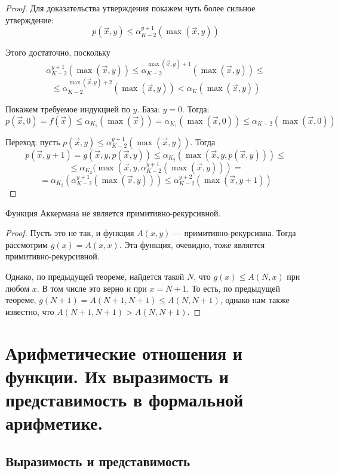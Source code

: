 \begin{proof}
Для доказательства утверждения покажем чуть более сильное утверждение:
$$p(\overrightarrow{x},y) \le \alpha_{K-2}^{y+1}(\max(\overrightarrow{x},y))$$

Этого достаточно, поскольку 
$$\alpha_{K-2}^{y+1}(\max(\overrightarrow{x},y)) \le
\alpha_{K-2}^{\max(\overrightarrow{x},y)+1}(\max(\overrightarrow{x},y)) \le$$
$$\le \alpha_{K-2}^{\max(\overrightarrow{x},y)+2}(\max(\overrightarrow{x},y)) <
\alpha_K(\max(\overrightarrow{x},y))$$

Покажем требуемое индукцией по $y$.
База: $y = 0$. Тогда: $$p(\overrightarrow{x},0) = f(\overrightarrow{x}) \le 
\alpha_{K_1}(\max(\overrightarrow{x})) = \alpha_{K_1}(\max(\overrightarrow{x},0)) \le 
\alpha_{K-2}(\max(\overrightarrow{x},0))$$

Переход: пусть $p(\overrightarrow{x},y) \le \alpha^{y+1}_{K-2}(\max(\overrightarrow{x},y))$.
Тогда $$p(\overrightarrow{x},y+1) = g(\overrightarrow{x},y,p(\overrightarrow{x},y))
\le \alpha_{K_2}(\max(\overrightarrow{x},y,p(\overrightarrow{x},y))) \le$$
$$\le \alpha_{K_2}(\max(\overrightarrow{x},y,\alpha^{y+1}_{K-2}(\max(\overrightarrow{x},y))) =$$
$$= \alpha_{K_2}(\alpha^{y+1}_{K-2}(\max(\overrightarrow{x},y)))
\le \alpha^{y+2}_{K-2}(\max(\overrightarrow{x},y+1))$$
\end{proof}

\begin{theorem}
Функция Аккермана не является примитивно-рекурсивной.
\end{theorem}

\begin{proof}
Пусть это не так, и функция $A(x,y)$ --- примитивно-рекурсивна.
Тогда рассмотрим $g(x) = A(x,x)$. Эта функция, очевидно, тоже является 
примитивно-рекурсивной. 

Однако, по предыдущей теореме, найдется такой $N$, что $g(x) \le A(N,x)$
при любом $x$. В том числе это верно и при $x=N+1$.
То есть, по предыдущей теореме, $g(N+1) = A(N+1,N+1) \le A(N,N+1)$, 
однако нам также известно, что $A(N+1,N+1) > A(N,N+1)$.
\end{proof}

\section{Арифметические отношения и функции. Их выразимость и представимость в формальной арифметике.}

\subsection{Выразимость и представимость}

